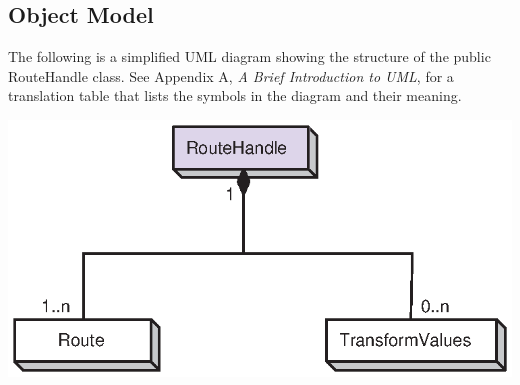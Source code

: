 \subsection{Object Model}

The following is a simplified UML diagram showing the structure of the public
RouteHandle class.  See Appendix A, {\it A Brief Introduction to UML}, for a
translation table that lists the symbols in the diagram and their meaning.

\begin{center}
\includegraphics{RouteHandle_obj}
\end{center}

\newpage





